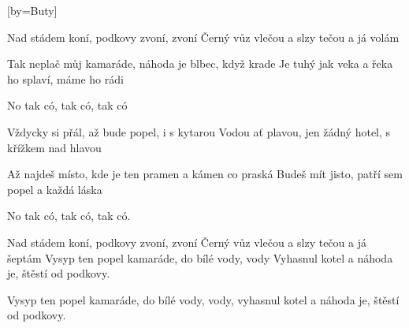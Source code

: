 [by={Buty}]

\beginverse{}
Nad stádem koní, podkovy zvoní, zvoní
Černý vůz vlečou a slzy tečou a já volám
\endverse{}

\beginverse{}
Tak neplač můj kamaráde, náhoda je blbec, když krade
Je tuhý jak veka a řeka ho splaví, máme ho rádi
\endverse{}

\beginchorus{}
No tak có, tak có, tak có
\endchorus{}

\beginverse{}
Vždycky si přál, až bude popel, i s kytarou
Vodou ať plavou, jen žádný hotel, s křížkem nad hlavou
\endverse{}

\beginverse{}
Až najdeš místo, kde je ten pramen a kámen co praská
Budeš mít jisto, patří sem popel a každá láska
\endverse{}

\beginchorus{}
No tak có, tak có, tak có.
\endchorus{}

\beginverse{}
Nad stádem koní, podkovy zvoní, zvoní
Černý vůz vlečou a slzy tečou a já šeptám
Vysyp ten popel kamaráde, do bílé vody, vody 
Vyhasnul kotel a náhoda je, štěstí od podkovy.
\endverse{}

\beginverse{}
\lrep{} Vysyp ten popel kamaráde, do bílé vody, vody,
vyhasnul kotel a náhoda je, štěstí od podkovy. \rrep{}
\endverse{}

\endsong{}
